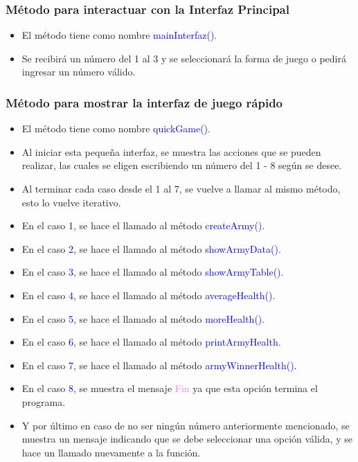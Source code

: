 \documentclass{article}
\begin{document}
\newpage 


\subsubsection{Método para interactuar con la Interfaz Principal} 
\begin{itemize}
    \item El método tiene como nombre \textcolor{blue}{mainInterfaz()}.
    \item Se recibirá un número del 1 al 3 y se seleccionará la forma de juego o pedirá ingresar un número válido.
\end{itemize}


\subsubsection{Método para mostrar la interfaz de juego rápido}
\begin{itemize}
    \item El método tiene como nombre \textcolor{blue}{quickGame()}.
    \item Al iniciar esta pequeña interfaz, se muestra las acciones que se pueden realizar, las cuales se eligen escribiendo un número del 1 - 8 según se desee.
    \item Al terminar cada caso desde el 1 al 7, se vuelve a llamar al mismo método, esto lo vuelve iterativo.
    \item En el caso \textcolor{blue}{1}, se hace el llamado al método \textcolor{blue}{createArmy()}.
    \item En el caso \textcolor{blue}{2}, se hace el llamado al método \textcolor{blue}{showArmyData()}.
    \item En el caso \textcolor{blue}{3}, se hace el llamado al método \textcolor{blue}{showArmyTable()}.
    \item En el caso \textcolor{blue}{4}, se hace el llamado al método \textcolor{blue}{averageHealth()}.
    \item En el caso \textcolor{blue}{5}, se hace el llamado al método \textcolor{blue}{moreHealth()}.
    \item En el caso \textcolor{blue}{6}, se hace el llamado al método \textcolor{blue}{printArmyHealth}.
    \item En el caso \textcolor{blue}{7}, se hace el llamado al método \textcolor{blue}{armyWinnerHealth()}.
    \item En el caso \textcolor{blue}{8}, se muestra el mensaje \textcolor{violet}{Fin} ya que esta opción termina el programa.
    \item Y por último en caso de no ser ningún número anteriormente mencionado, se muestra un mensaje indicando que se debe seleccionar una opción válida, y se hace un llamado nuevamente a la función.
\end{itemize}

\end{document}
